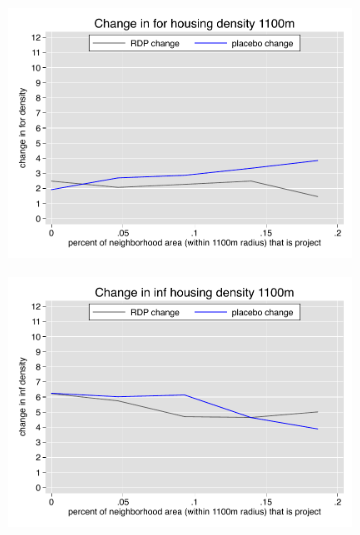 \documentclass[12pt]{article}
\begin{document}
\begin{figure}
        \begin{subfigure}[b]{0.495\textwidth}
            \centering
            \includegraphics[width=\textwidth,trim={0.3cm .3cm 0.1cm 0cm}, clip=true]{figures/change_for_1100_total.pdf}
        \end{subfigure}
        \hfill
        \begin{subfigure}[b]{0.495\textwidth}  
            \centering 
            \includegraphics[width=\textwidth,trim={0.3cm .3cm 0.1cm 0cm}, clip=true]{figures/change_inf_1100_total.pdf}
        \end{subfigure}
        \vspace{-6mm}
  \end{figure} 
\end{document}

